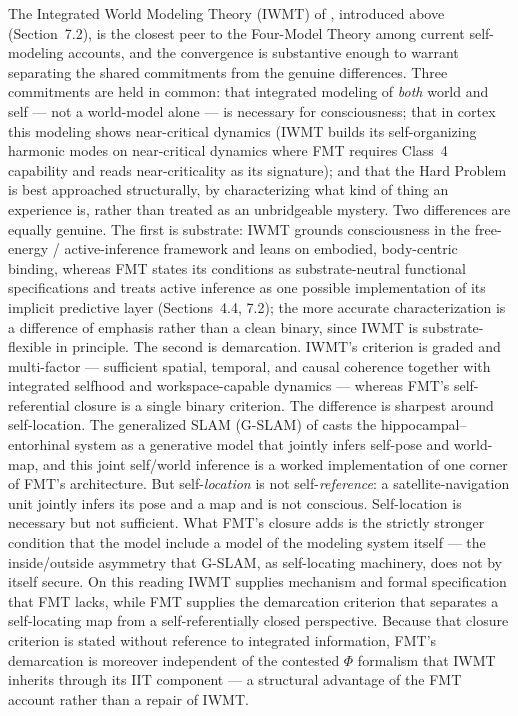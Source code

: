\documentclass[12pt]{article}
\begin{document}
The Integrated World Modeling Theory (IWMT) of \citet{Safron2020}, introduced above (Section~7.2), is the closest peer to the Four-Model Theory among current self-modeling accounts, and the convergence is substantive enough to warrant separating the shared commitments from the genuine differences. Three commitments are held in common: that integrated modeling of \emph{both} world and self --- not a world-model alone --- is necessary for consciousness; that in cortex this modeling shows near-critical dynamics (IWMT builds its self-organizing harmonic modes on near-critical dynamics where FMT requires Class~4 capability and reads near-criticality as its signature); and that the Hard Problem is best approached structurally, by characterizing what kind of thing an experience is, rather than treated as an unbridgeable mystery. Two differences are equally genuine. The first is substrate: IWMT grounds consciousness in the free-energy / active-inference framework and leans on embodied, body-centric binding, whereas FMT states its conditions as substrate-neutral functional specifications and treats active inference as one possible implementation of its implicit predictive layer (Sections~4.4, 7.2); the more accurate characterization is a difference of emphasis rather than a clean binary, since IWMT is substrate-flexible in principle. The second is demarcation. IWMT's criterion is graded and multi-factor --- sufficient spatial, temporal, and causal coherence together with integrated selfhood and workspace-capable dynamics --- whereas FMT's self-referential closure is a single binary criterion. The difference is sharpest around self-location. The generalized SLAM (G-SLAM) of \citet{SafronCatalVerbelen2022} casts the hippocampal--entorhinal system as a generative model that jointly infers self-pose and world-map, and this joint self/world inference is a worked implementation of one corner of FMT's architecture. But self-\emph{location} is not self-\emph{reference}: a satellite-navigation unit jointly infers its pose and a map and is not conscious. Self-location is necessary but not sufficient. What FMT's closure adds is the strictly stronger condition that the model include a model of the modeling system itself --- the inside/outside asymmetry that G-SLAM, as self-locating machinery, does not by itself secure. On this reading IWMT supplies mechanism and formal specification that FMT lacks, while FMT supplies the demarcation criterion that separates a self-locating map from a self-referentially closed perspective. Because that closure criterion is stated without reference to integrated information, FMT's demarcation is moreover independent of the contested $\Phi$ formalism that IWMT inherits through its IIT component --- a structural advantage of the FMT account rather than a repair of IWMT.
\end{document}
